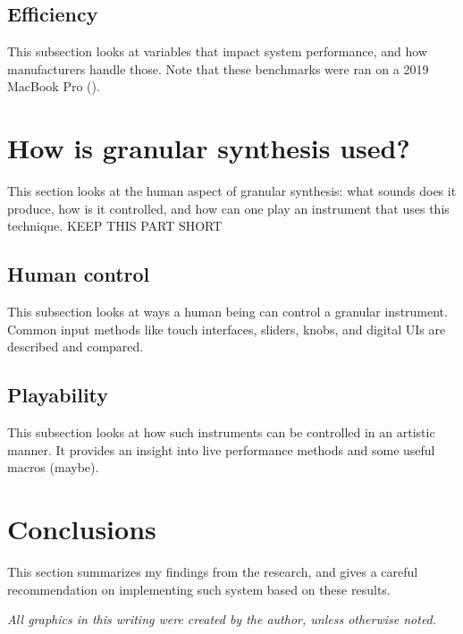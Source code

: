 \documentclass[10pt, twocolumn]{IEEEtran}
\begin{document}
\subsection{Efficiency}
This subsection looks at variables that impact system performance, and how manufacturers handle those. Note that these benchmarks were ran on a 2019 MacBook Pro ().

\section{How is granular synthesis used?}
This section looks at the human aspect of granular synthesis: what sounds does it produce, how is it controlled, and how can one play an instrument that uses this technique. KEEP THIS PART SHORT

\subsection{Human control}
This subsection looks at ways a human being can control a granular instrument. Common input methods like touch interfaces, sliders, knobs, and digital UIs are described and compared.

\subsection{Playability}
This subsection looks at how such instruments can be controlled in an artistic manner. It provides an insight into live performance methods and some useful macros (maybe).

\section*{Conclusions}
This section summarizes my findings from the research, and gives a careful recommendation on implementing such system based on these results.

\printbibliography
\textit{All graphics in this writing were created by the author, unless otherwise noted.}
\end{document}
